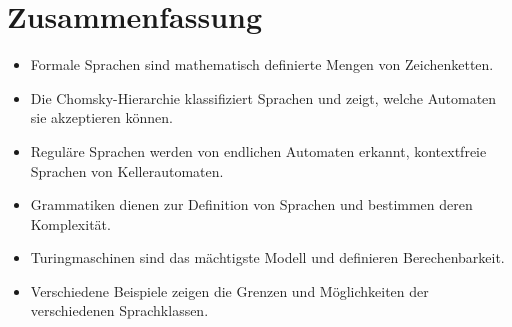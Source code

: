 \documentclass{article}
\begin{document}
	\section{Zusammenfassung}
	\begin{itemize}
		\item Formale Sprachen sind mathematisch definierte Mengen von Zeichenketten.
		\item Die Chomsky-Hierarchie klassifiziert Sprachen und zeigt, welche Automaten sie akzeptieren können.
		\item Reguläre Sprachen werden von endlichen Automaten erkannt, kontextfreie Sprachen von Kellerautomaten.
		\item Grammatiken dienen zur Definition von Sprachen und bestimmen deren Komplexität.
		\item Turingmaschinen sind das mächtigste Modell und definieren Berechenbarkeit.
		\item Verschiedene Beispiele zeigen die Grenzen und Möglichkeiten der verschiedenen Sprachklassen.
	\end{itemize}
	
\end{document}

